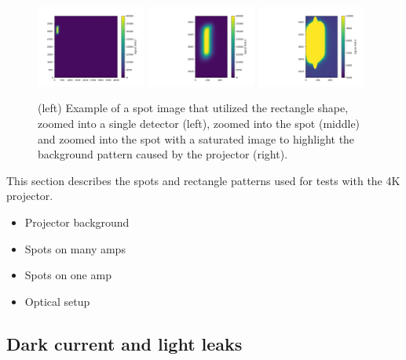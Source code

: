 \begin{figure}[htbp]
\centering
\includegraphics[width=0.32\textwidth]{figures/Rectange_Detector_Ex.png}
\includegraphics[width=0.32\textwidth]{figures/Rectange_Spot_Ex.png}
\includegraphics[width=0.32\textwidth]{figures/Rectange_Spot_Sat.png}
\caption{(left) Example of a spot image that utilized the rectangle shape, zoomed into a single detector (left), zoomed into the spot (middle) and zoomed into the spot with a saturated image to highlight the background pattern caused by the projector (right).}
\label{fig:SpotProjector_Rect}
\end{figure}

This section describes the spots and rectangle patterns used for tests with the 4K
projector.

\begin{itemize}
\tightlist
\item  Projector background
\item  Spots on many amps
\item  Spots on one amp
\item  Optical setup
\end{itemize}

\subsection{Dark current and light
leaks}\label{dark-current-and-light-leaks}


